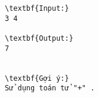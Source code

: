 \begin{verbatim}
\textbf{Input:}
3 4

\textbf{Output:}
7


\textbf{Gợi ý:}
Sử dụng toán tử "+" .
\end{verbatim}
